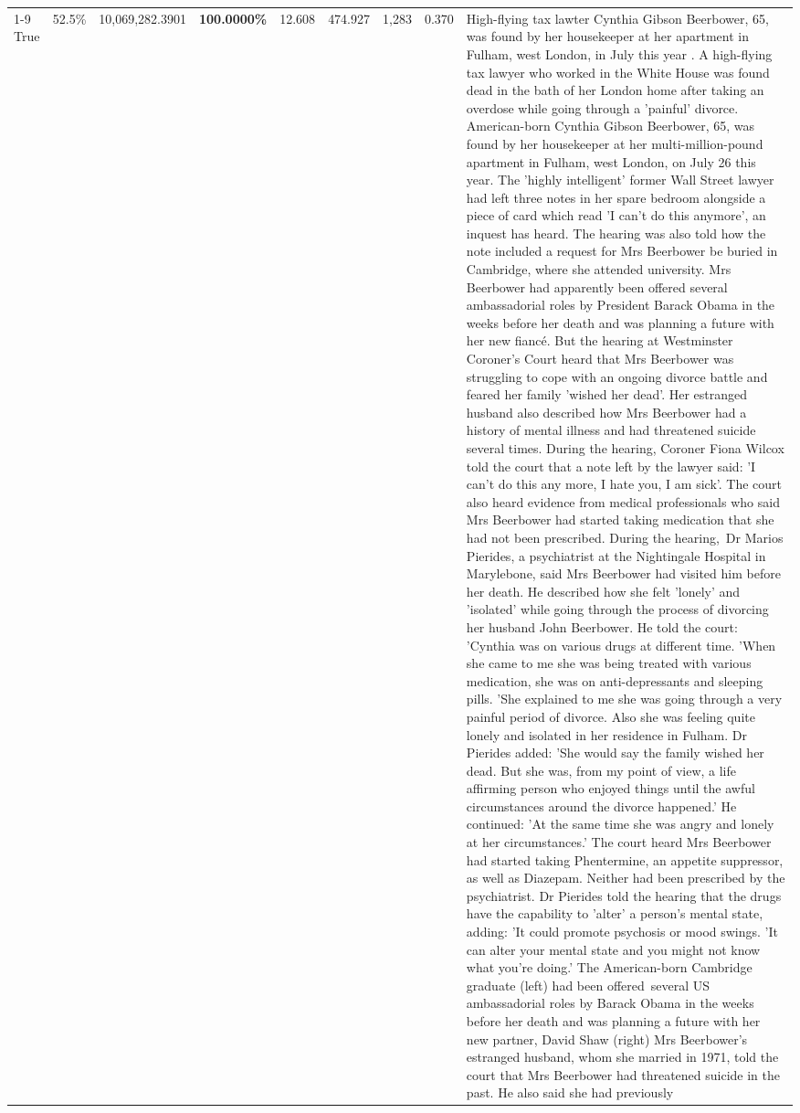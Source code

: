 \begin{table}[H]
\begin{tabular}{lllrlllll}
\cline{1-9}
True & 52.5\% & 10,069,282.3901 & \bfseries \color{red} 100.0000\% & 12.608 & 474.927 & 1,283 & 0.370 & High-flying tax lawter Cynthia Gibson Beerbower, 65, was found by her housekeeper at her apartment in Fulham, west London, in July this year . A high-flying tax lawyer who worked in the White House was found dead in the bath of her London home after taking an overdose while going through a 'painful' divorce. American-born Cynthia Gibson Beerbower, 65, was found by her housekeeper at her multi-million-pound apartment in Fulham, west London, on July 26 this year. The 'highly intelligent' former Wall Street lawyer had left three notes in her spare bedroom alongside a piece of card which read 'I can't do this anymore', an inquest has heard. The hearing was also told how the note included a request for Mrs Beerbower be buried in Cambridge, where she attended university. Mrs Beerbower had apparently been offered several ambassadorial roles by President Barack Obama in the weeks before her death and was planning a future with her new fiancé. But the hearing at Westminster Coroner's Court heard that Mrs Beerbower was struggling to cope with an ongoing divorce battle and feared her family 'wished her dead'. Her estranged husband also described how Mrs Beerbower had a history of mental illness and had threatened suicide several times. During the hearing, Coroner Fiona Wilcox told the court that a note left by the lawyer said: 'I can't do this any more, I hate you, I am sick'. The court also heard evidence from medical professionals who said Mrs Beerbower had started taking medication that she had not been prescribed. During the hearing, Dr Marios Pierides, a psychiatrist at the Nightingale Hospital in Marylebone, said Mrs Beerbower had visited him before her death. He described how she felt 'lonely' and 'isolated' while going through the process of divorcing her husband John Beerbower. He told the court: 'Cynthia was on various drugs at different time. 'When she came to me she was being treated with various medication, she was on anti-depressants and sleeping pills. 'She explained to me she was going through a very painful period of divorce. Also she was feeling quite lonely and isolated in her residence in Fulham. Dr Pierides added: 'She would say the family wished her dead. But she was, from my point of view, a life affirming person who enjoyed things until the awful circumstances around the divorce happened.' He continued: 'At the same time she was angry and lonely at her circumstances.' The court heard Mrs Beerbower had started taking Phentermine, an appetite suppressor, as well as Diazepam. Neither had been prescribed by the psychiatrist. Dr Pierides told the hearing that the drugs have the capability to 'alter' a person's mental state, adding: 'It could promote psychosis or mood swings. 'It can alter your mental state and you might not know what you're doing.' The American-born Cambridge graduate (left) had been offered several US ambassadorial roles by Barack Obama in the weeks before her death and was planning a future with her new partner, David Shaw (right) Mrs Beerbower's estranged husband, whom she married in 1971, told the court that Mrs Beerbower had threatened suicide in the past. He also said she had previously 
\end{tabular}
\end{table}
